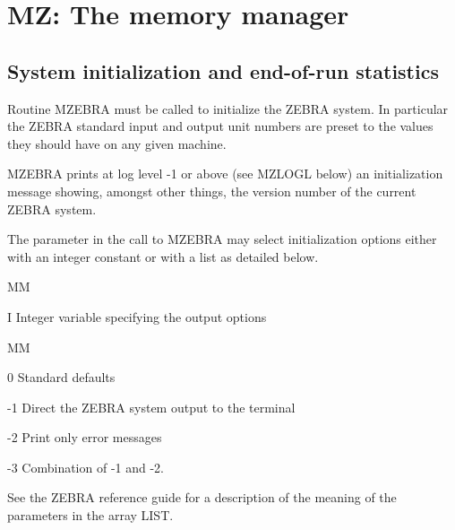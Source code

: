 \chapter{MZ: The memory manager}
\section{System initialization and end-of-run statistics}
\par Routine MZEBRA must be called to initialize the ZEBRA system.
In particular the ZEBRA standard input and output unit numbers are
preset to the values they should have on any given machine.
\par MZEBRA prints at log level -1 or above (see MZLOGL below)
an initialization message
showing, amongst other things, the version number of the
current ZEBRA system.
\par The parameter in the call to MZEBRA may select initialization
options either with an integer constant or with a list as detailed below.
\Idesc
\begin{DL}{MM}
\item[I]Integer variable specifying the output options
\begin{DL}{MM}
\item[ 0]Standard defaults
\item[-1]Direct the ZEBRA system output to the terminal
\item[-2]Print only error messages
\item[-3]Combination of -1 and -2.
\end{DL}
\end{DL}
See the ZEBRA reference guide for a description of the meaning
of the parameters in the array LIST.
